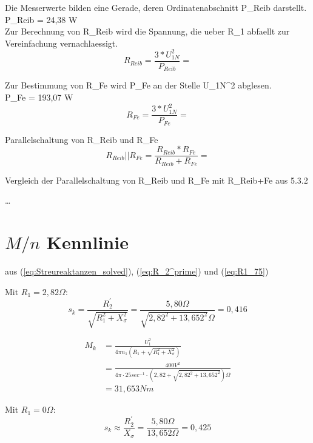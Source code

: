 \documentclass[conference]{IEEEtran}
\begin{document}
Die Messerwerte bilden eine Gerade, deren Ordinatenabschnitt P_{Reib} darstellt.\\
P_{Reib} = 24,38 W\\
Zur Berechnung von R_{Reib} wird die Spannung, die ueber R_{1} abfaellt zur Vereinfachung vernachlaessigt.
\begin{equation}
    R_{Reib} = \dfrac{3*U_{1N}^{2}}{ P_{Reib} } = 
\end{equation}

Zur Bestimmung von R_{Fe} wird P_{Fe} an der Stelle U_{1N}^{2} abglesen.\\
P_{Fe} = 193,07 W\\

\begin{equation}
    R_{Fe} = \dfrac{3*U_{1N}^{2}}{ P_{Fe} } = 
\end{equation}


Parallelschaltung von R_{Reib} und R_{Fe}
\begin{equation}
R_{Reib}||R_{Fe} = \dfrac{ R_{Reib} * R_{Fe}}{R_{Reib} + R_{Fe}} = 
\end{equation}

Vergleich der Parallelschaltung von R_{Reib} und R_{Fe} mit R_{Reib+Fe} aus 5.3.2

\dots

\section{$M/n$ Kennlinie}

aus (\ref{eq:Streureaktanzen_solved}), (\ref{eq:R_2^prime}) und (\ref{eq:R1_75})

\smallskip
Mit $R_1 = 2,82\Omega$:
\begin{equation} \label{eq:s_k-mit-R_1}
    s_k = \frac{R_2^{\prime}}{\sqrt{R_{1}^{2} + X_{\sigma}^{2}}} = \frac{5,80\Omega}{\sqrt{2,82^2+13,652^2}\Omega} = 0,416
\end{equation}

\begin{align}
    M_{k} & = \frac{U_{1}^{2}}{4 \pi n_{1} \left(R_{1} + \sqrt{R_{1}^{2} + X_{\sigma}^{2}}\right)}           \\
          & = \frac{400\si{V}^{2}}{4 \pi \cdot 25 \si{sec^{-1}} \cdot (2,82 + \sqrt{2,82^2+13,652^2})\Omega} \\
          & = 31,653 \si{Nm}
    \label{eq:M_k-mit-R_1}
\end{align}

\smallskip
Mit $R_1 = 0\Omega$:
\begin{equation} \label{eq:s_k-naehrung}
    s_k \approx \frac{R_2^{\prime}}{X_{\sigma}} = \frac{5,80\Omega}{13,652\Omega} = 0,425
\end{equation}
\end{document}
